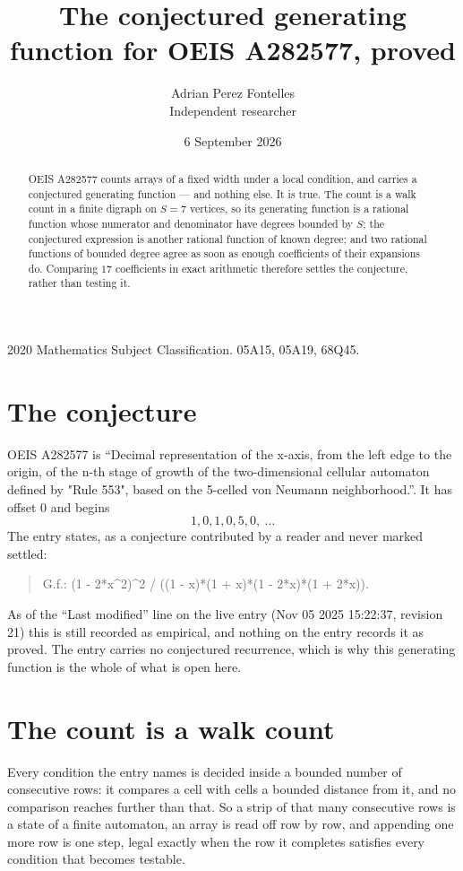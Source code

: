 \documentclass[11pt,a4paper]{article}
\title{The conjectured generating function for OEIS A282577, proved}
\author{Adrian Perez Fontelles\\ \small Independent researcher}
\date{6 September 2026}
\theoremstyle{plain}
\theoremstyle{definition}
\begin{document}
\maketitle

\begin{abstract}
OEIS A282577 counts arrays of a fixed width under a local condition, and carries a conjectured
generating function --- and nothing else. It is true. The count is a walk count in a finite
digraph on $S=7$ vertices, so its generating function is a rational function whose numerator
and denominator have degrees bounded by $S$; the conjectured expression is another rational
function of known degree; and two rational functions of bounded degree agree as soon as enough
coefficients of their expansions do. Comparing $17$ coefficients in exact arithmetic
therefore settles the conjecture, rather than testing it.
\end{abstract}

\noindent\small 2020 Mathematics Subject Classification. 05A15, 05A19, 68Q45.\normalsize

\section{The conjecture}

OEIS A282577 is ``Decimal representation of the x-axis, from the left edge to the origin, of the n-th stage of growth of the two-dimensional cellular automaton defined by "Rule 553", based on the 5-celled von Neumann neighborhood.''. It has offset $0$ and begins
\[
1, 0, 1, 0, 5, 0,\ \dots
\]
The entry states, as a conjecture contributed by a reader and never marked settled:
\begin{quote}
G.f.: (1 - 2*x\^{}2)\^{}2 / ((1 - x)*(1 + x)*(1 - 2*x)*(1 + 2*x)).
\end{quote}
As of the ``Last modified'' line on the live entry (Nov 05 2025 15:22:37, revision 21) this is still
recorded as empirical, and nothing on the entry records it as proved. The entry carries no
conjectured recurrence, which is why this generating function is the whole of what is open
here.

\section{The count is a walk count}

Every condition the entry names is decided inside a bounded number of consecutive rows: it
compares a cell with cells a bounded distance from it, and no comparison reaches further than
that. So a strip of that many consecutive rows is a state of a finite automaton, an array is
read off row by row, and appending one more row is one step, legal exactly when the row it
completes satisfies every condition that becomes testable.
\end{document}
